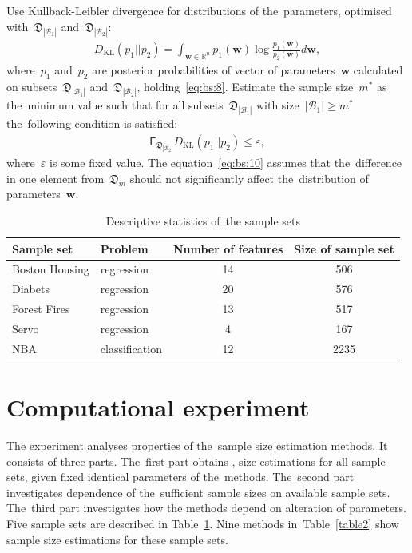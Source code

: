 \documentclass[
11pt,%
tightenlines,%
twoside,%
onecolumn,%
nofloats,%
nobibnotes,%
nofootinbib,%
superscriptaddress,%
noshowpacs,%
centertags]%
{revtex4}
\begin{document}
Use Kullback-Leibler divergence for distributions of the~parameters, optimised with~$\mathfrak{D}_{|\mathcal{B}_1|}$ and~$\mathfrak{D}_{|\mathcal{B}_2|}$:
\[
\label{eq:bs:9}
\begin{aligned}
	D_\text{KL}\left(p_1 || p_2\right) = \int_{\mathbf{w}\in\mathbb{R}^{n}}p_1(\mathbf{w})\log\frac{p_1(\mathbf{w})}{p_2(\mathbf{w})}d\mathbf{w},
\end{aligned}
\]
where~$p_1$ and~$p_2$ are posterior probabilities of vector of parameters~$\mathbf{w}$ calculated on subsets~$\mathfrak{D}_{|\mathcal{B}_1|}$ and~$\mathfrak{D}_{|\mathcal{B}_2|}$, holding~\eqref{eq:bs:8}.
Estimate the sample size~$m^*$ as the~minimum value such that for all subsets~$\mathfrak{D}_{|\mathcal{B}_1|}$ with size~$|\mathcal{B}_1|\geq m^*$ the~following condition is satisfied:
\[
\label{eq:bs:10}
\begin{aligned}
	\mathsf{E}_{\mathfrak{D}_{|\mathcal{B}_2|}}D_\text{KL}\left(p_1 || p_2\right) \leq \varepsilon,
\end{aligned}
\]
where~$\varepsilon$ is some fixed value. The equation~\eqref{eq:bs:10} assumes that the~difference in one element from~$\mathfrak{D}_m$ should not significantly affect the~distribution of parameters~$\mathbf{w}$. 

\begin{table}[!htp]
\centering
\caption{ Descriptive statistics of~the sample sets}
\label{table20}
\begin{tabular}{l|l|c|c}
\hline
	\centering Sample set & Problem & Number of features & Size of sample set\\ 
	\hline 	Boston Housing 	&regression		&14 & 506\\
	\hline	Diabets 				& regression		&20 & 576\\
	\hline	Forest Fires 			& regression		& 13 & 517\\
 	\hline	Servo 					& regression 	& 4 & 167\\
	\hline	NBA				 		& classification	& 12 & 2235\\
\hline
\end{tabular}
\end{table} 
	 
\section{Computational experiment}
The experiment analyses  properties of the~sample size estimation methods. It consists of three parts. The~first part obtains , size estimations for all sample sets, given fixed identical parameters of the~methods. The~second part investigates dependence of the~sufficient sample sizes on available sample sets. The~third part investigates how the methods depend on alteration of parameters. Five sample sets are described in Table~\ref{table20}. Nine methods in~Table~\ref{table2} show sample size estimations for these sample sets. 
 
\end{document}
